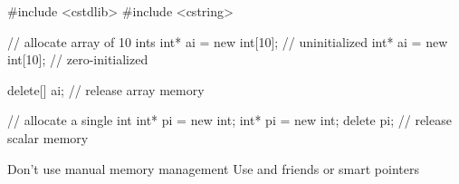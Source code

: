 \begin{frame}[fragile]
  \begin{cppcode}
    #include <cstdlib>
    #include <cstring>

    // allocate array of 10 ints
    int* ai = new int[10];   // uninitialized
    int* ai = new int[10]{}; // zero-initialized

    delete[] ai; // release array memory

    // allocate a single int
    int* pi = new int;
    int* pi = new int{};
    delete pi; // release scalar memory
  \end{cppcode}
  \begin{goodpractice}{Don't use manual memory management}
    Use  and friends or smart pointers
  \end{goodpractice}
\end{frame}
